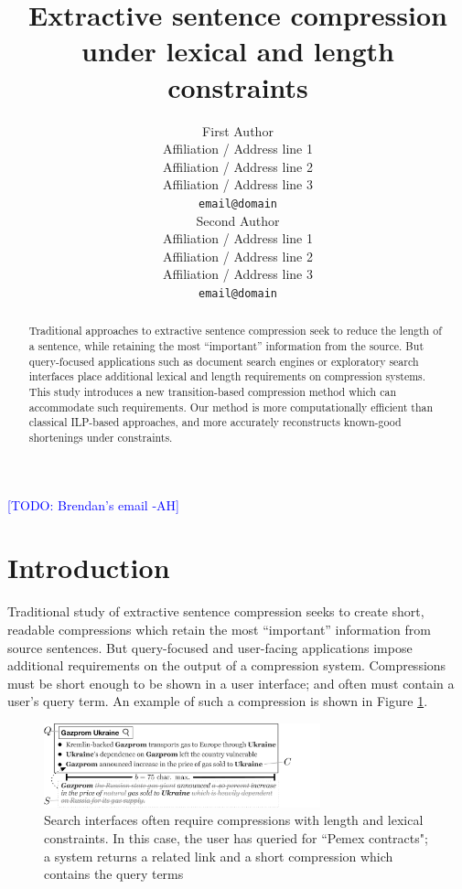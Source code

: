 \documentclass[11pt,a4paper]{article}
\title{Extractive sentence compression under lexical and length constraints}
\author{First Author \\
  Affiliation / Address line 1 \\
  Affiliation / Address line 2 \\
  Affiliation / Address line 3 \\
  {\tt email@domain} \\\And
  Second Author \\
  Affiliation / Address line 1 \\
  Affiliation / Address line 2 \\
  Affiliation / Address line 3 \\
  {\tt email@domain} \\}
\date{}
\newcommand{\ahcomment}[1]{\textcolor{blue}{[#1 -AH]}}
\begin{document}
\maketitle

\begin{abstract}
Traditional approaches to extractive sentence compression seek to reduce the length of a sentence, while retaining the most ``important'' information from the source. But query-focused applications such as document search engines or exploratory search interfaces place additional lexical and length requirements on compression systems. This study introduces a new transition-based compression method which can accommodate such requirements.  Our method is more computationally efficient than classical ILP-based approaches, and more accurately reconstructs known-good shortenings under constraints.
\end{abstract}


\ahcomment{TODO: Brendan's email}




\section{Introduction}

Traditional study of extractive sentence compression seeks to create short, readable compressions which retain the most ``important'' information from source sentences. But query-focused and user-facing applications impose additional requirements on the output of a compression system. Compressions must be short enough to be shown in a user interface; and often must contain a user's query term. An example of such a compression is shown in Figure \ref{f:qf}.
\begin{figure}[htb!]
\includegraphics[width=8cm]{qf.pdf}
\caption{Search interfaces often require compressions with length and lexical constraints. In this case, the user has queried for ``Pemex contracts"; a system returns a related link and a short compression which contains the query terms}
\label{f:qf}
\end{figure}
\end{document}
